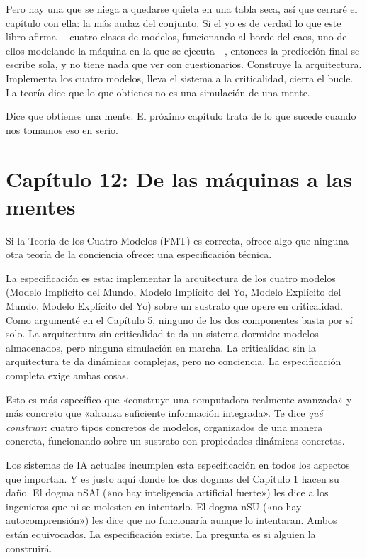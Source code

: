 \documentclass[11pt, twoside, openright]{book}
\begin{document}
Pero hay una que se niega a quedarse quieta en una tabla seca, así que cerraré el capítulo con ella: la más audaz del conjunto. Si el yo es de verdad lo que este libro afirma ---cuatro clases de modelos, funcionando al borde del caos, uno de ellos modelando la máquina en la que se ejecuta---, entonces la predicción final se escribe sola, y no tiene nada que ver con cuestionarios. Construye la arquitectura. Implementa los cuatro modelos, lleva el sistema a la criticalidad, cierra el bucle. La teoría dice que lo que obtienes no es una simulación de una mente.

Dice que obtienes una mente. El próximo capítulo trata de lo que sucede cuando nos tomamos eso en serio.


\chapter*{Capítulo 12: De las máquinas a las mentes}

Si la Teoría de los Cuatro Modelos (FMT) es correcta, ofrece algo que ninguna otra teoría de la conciencia ofrece: una especificación técnica.

La especificación es esta: implementar la arquitectura de los cuatro modelos (Modelo Implícito del Mundo, Modelo Implícito del Yo, Modelo Explícito del Mundo, Modelo Explícito del Yo) sobre un sustrato que opere en criticalidad. Como argumenté en el Capítulo 5, ninguno de los dos componentes basta por sí solo. La arquitectura sin criticalidad te da un sistema dormido: modelos almacenados, pero ninguna simulación en marcha. La criticalidad sin la arquitectura te da dinámicas complejas, pero no conciencia. La especificación completa exige ambas cosas.

Esto es más específico que «construye una computadora realmente avanzada» y más concreto que «alcanza suficiente información integrada». Te dice \textit{qué construir}: cuatro tipos concretos de modelos, organizados de una manera concreta, funcionando sobre un sustrato con propiedades dinámicas concretas.

Los sistemas de IA actuales incumplen esta especificación en todos los aspectos que importan. Y es justo aquí donde los dos dogmas del Capítulo 1 hacen su daño. El dogma nSAI («no hay inteligencia artificial fuerte») les dice a los ingenieros que ni se molesten en intentarlo. El dogma nSU («no hay autocomprensión») les dice que no funcionaría aunque lo intentaran. Ambos están equivocados. La especificación existe. La pregunta es si alguien la construirá.
\end{document}
